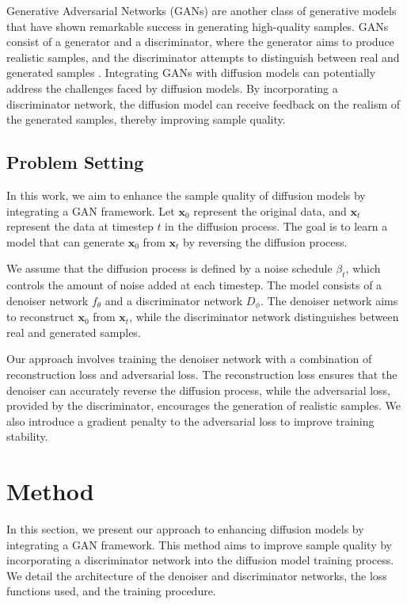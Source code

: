 \documentclass{article} %
\begin{document}
Generative Adversarial Networks (GANs) are another class of generative models that have shown remarkable success in generating high-quality samples. GANs consist of a generator and a discriminator, where the generator aims to produce realistic samples, and the discriminator attempts to distinguish between real and generated samples \citep{gan}. Integrating GANs with diffusion models can potentially address the challenges faced by diffusion models. By incorporating a discriminator network, the diffusion model can receive feedback on the realism of the generated samples, thereby improving sample quality.

\subsection{Problem Setting}
\label{sec:problem_setting}

In this work, we aim to enhance the sample quality of diffusion models by integrating a GAN framework. Let $\mathbf{x}_0$ represent the original data, and $\mathbf{x}_t$ represent the data at timestep $t$ in the diffusion process. The goal is to learn a model that can generate $\mathbf{x}_0$ from $\mathbf{x}_t$ by reversing the diffusion process.

We assume that the diffusion process is defined by a noise schedule $\beta_t$, which controls the amount of noise added at each timestep. The model consists of a denoiser network $f_\theta$ and a discriminator network $D_\phi$. The denoiser network aims to reconstruct $\mathbf{x}_0$ from $\mathbf{x}_t$, while the discriminator network distinguishes between real and generated samples.

Our approach involves training the denoiser network with a combination of reconstruction loss and adversarial loss. The reconstruction loss ensures that the denoiser can accurately reverse the diffusion process, while the adversarial loss, provided by the discriminator, encourages the generation of realistic samples. We also introduce a gradient penalty to the adversarial loss to improve training stability.

\section{Method}
\label{sec:method}

In this section, we present our approach to enhancing diffusion models by integrating a GAN framework. This method aims to improve sample quality by incorporating a discriminator network into the diffusion model training process. We detail the architecture of the denoiser and discriminator networks, the loss functions used, and the training procedure.
\end{document}
